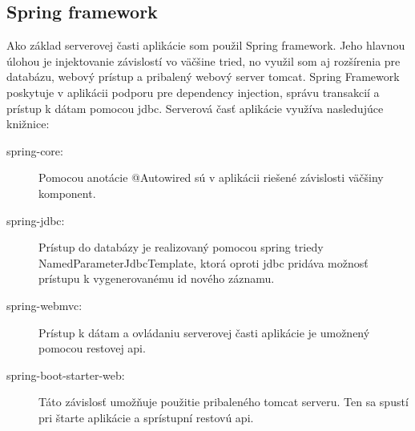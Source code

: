 	\subsection{Spring framework}
		Ako základ serverovej časti aplikácie som použil Spring framework. Jeho hlavnou úlohou je injektovanie závislostí vo väčšine tried, no využil som aj rozšírenia pre databázu, webový prístup a pribalený webový server tomcat.
		Spring Framework poskytuje v aplikácii podporu pre dependency injection, správu transakcií a prístup k dátam pomocou jdbc. Serverová časť aplikácie využíva nasledujúce knižnice:
		\begin{description}
			\item[spring-core:] Pomocou anotácie @Autowired sú v aplikácii riešené závislosti väčšiny komponent.
			\item[spring-jdbc:] Prístup do databázy je realizovaný pomocou spring triedy NamedParameterJdbcTemplate, ktorá oproti jdbc pridáva možnosť prístupu k vygenerovanému id nového záznamu.
			\item[spring-webmvc:] Prístup k dátam a ovládaniu serverovej časti aplikácie je umožnený pomocou restovej api.
			\item[spring-boot-starter-web:] Táto závislosť umožňuje použitie pribaleného tomcat serveru. Ten sa spustí pri štarte aplikácie a sprístupní restovú api.
		\end{description}

